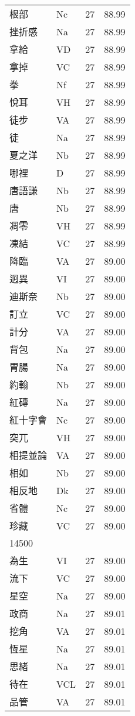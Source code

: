\documentclass[twocolumn]{book}
\begin{document}
\begin{supertabular}{llrr}
根部 & Nc & 27 &  88.99\\
挫折感 & Na & 27 &  88.99\\
拿給 & VD & 27 &  88.99\\
拿掉 & VC & 27 &  88.99\\
拳 & Nf & 27 &  88.99\\
悅耳 & VH & 27 &  88.99\\
徒步 & VA & 27 &  88.99\\
徒 & Na & 27 &  88.99\\
夏之洋 & Nb & 27 &  88.99\\
哪裡 & D & 27 &  88.99\\
唐語謙 & Nb & 27 &  88.99\\
唐 & Nb & 27 &  88.99\\
凋零 & VH & 27 &  88.99\\
凍結 & VC & 27 &  88.99\\
降臨 & VA & 27 &  89.00\\
迥異 & VI & 27 &  89.00\\
迪斯奈 & Nb & 27 &  89.00\\
訂立 & VC & 27 &  89.00\\
計分 & VA & 27 &  89.00\\
背包 & Na & 27 &  89.00\\
胃腸 & Na & 27 &  89.00\\
約翰 & Nb & 27 &  89.00\\
紅磚 & Na & 27 &  89.00\\
紅十字會 & Nc & 27 &  89.00\\
突兀 & VH & 27 &  89.00\\
相提並論 & VA & 27 &  89.00\\
相如 & Nb & 27 &  89.00\\
相反地 & Dk & 27 &  89.00\\
省體 & Nc & 27 &  89.00\\
珍藏 & VC & 27 &  89.00\\
14500\\
為生 & VI & 27 &  89.00\\
流下 & VC & 27 &  89.00\\
星空 & Na & 27 &  89.00\\
政商 & Na & 27 &  89.01\\
挖角 & VA & 27 &  89.01\\
恆星 & Na & 27 &  89.01\\
思緒 & Na & 27 &  89.01\\
待在 & VCL & 27 &  89.01\\
品管 & VA & 27 &  89.01\\

\end{supertabular}
\end{document}
